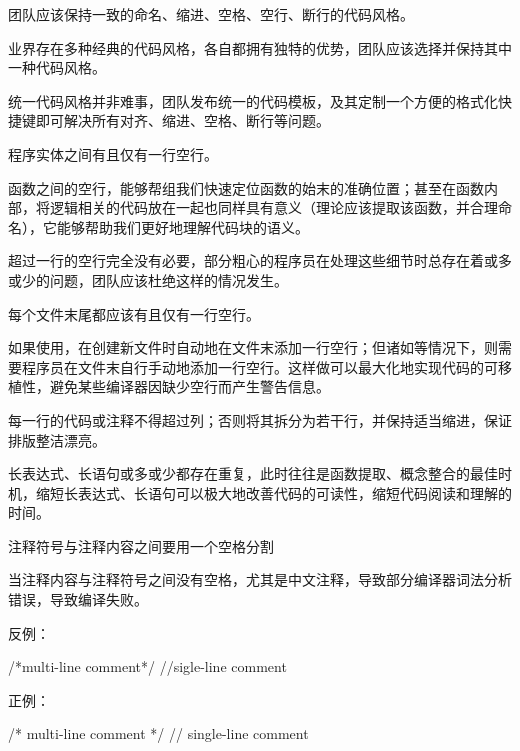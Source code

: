 \begin{content}

\begin{regulation}
团队应该保持一致的命名、缩进、空格、空行、断行的代码风格。
\end{regulation}

业界存在多种经典的代码风格，各自都拥有独特的优势，团队应该选择并保持其中一种代码风格。

\begin{enum}
\end{enum}

统一代码风格并非难事，团队发布统一的代码模板，及其定制一个方便的格式化快捷键即可解决所有对齐、缩进、空格、断行等问题。

\begin{regulation}
程序实体之间有且仅有一行空行。
\end{regulation}

函数之间的空行，能够帮组我们快速定位函数的始末的准确位置；甚至在函数内部，将逻辑相关的代码放在一起也同样具有意义（理论应该提取该函数，并合理命名），它能够帮助我们更好地理解代码块的语义。

超过一行的空行完全没有必要，部分粗心的程序员在处理这些细节时总存在着或多或少的问题，团队应该杜绝这样的情况发生。

\begin{regulation}
每个文件末尾都应该有且仅有一行空行。
\end{regulation}

如果使用，在创建新文件时自动地在文件末添加一行空行；但诸如等情况下，则需要程序员在文件末自行手动地添加一行空行。这样做可以最大化地实现代码的可移植性，避免某些编译器因缺少空行而产生警告信息。

\begin{regulation}
每一行的代码或注释不得超过列；否则将其拆分为若干行，并保持适当缩进，保证排版整洁漂亮。
\end{regulation}

长表达式、长语句或多或少都存在重复，此时往往是函数提取、概念整合的最佳时机，缩短长表达式、长语句可以极大地改善代码的可读性，缩短代码阅读和理解的时间。

\begin{regulation}
注释符号与注释内容之间要用一个空格分割
\end{regulation}

当注释内容与注释符号之间没有空格，尤其是中文注释，导致部分编译器词法分析错误，导致编译失败。

反例：
\begin{leftbar}
\begin{c++}
/*multi-line comment*/
//sigle-line comment
\end{c++}
\end{leftbar}

正例：
\begin{leftbar}
\begin{c++}
/* multi-line comment */
// single-line comment
\end{c++}
\end{leftbar}

\end{content}
